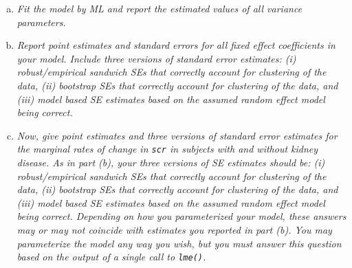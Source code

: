 \documentclass[11pt, letterpaper]{article}
\begin{document}
\begin{enumerate}[(a)]
\item {\em Fit the model by ML and
report the
estimated values of all variance parameters. }

\item {\em  Report point estimates and standard errors for all fixed effect
coefficients in your model.  Include three versions of standard error estimates: (i) robust/empirical sandwich SEs that correctly
account for clustering of the data, (ii) bootstrap SEs that correctly account for clustering of the data, and (iii) model based SE estimates based on the assumed random effect model being correct.}

\item {\em  Now, give point estimates and three versions of standard error estimates for the marginal rates of change in \texttt{scr} in subjects with and without 
kidney disease.  As in part (b), your three versions of SE estimates should be:  (i) robust/empirical sandwich SEs that correctly
account for clustering of the data, (ii) bootstrap SEs that correctly account for clustering of the data, and (iii) model based SE estimates based on the assumed random effect model being correct.  Depending on how you parameterized your model, these answers may or may not 
coincide with estimates you reported in part (b).  You may parameterize the model any way you wish,
but you must answer this question based on the output of a single call to \texttt{lme()}.}

\end{enumerate}
\end{document}
